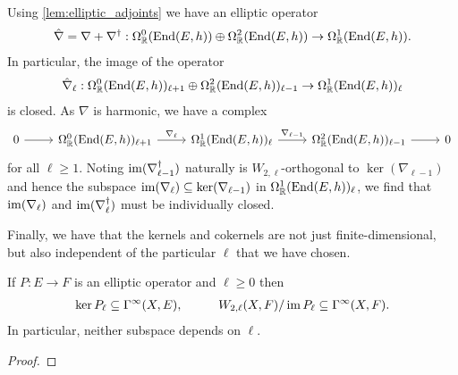 \documentclass[12pt]{ociamthesis}  %
\begin{document}
\begin{example}\label{ex:nabla_hat_elliptic}
  Using \ref{lem:elliptic_adjoints} we have an elliptic operator
  \begin{align*}
    \hat\nabla = \nabla + \nabla^\dagger :
    \Omega^0_{\mathbb R}(\operatorname{End}(E,h)) \oplus
    \Omega^2_{\mathbb R}(\operatorname{End}(E,h)) \to
    \Omega^1_{\mathbb R}(\operatorname{End}(E,h)).
  \end{align*}
  In particular, the image of the operator
  \begin{align*}
    \hat\nabla_\ell :
    \Omega^0_{\mathbb R}(\operatorname{End}(E,h))_{\ell+1}
    \oplus \Omega^2_{\mathbb R}(\operatorname{End}(E,h))_{\ell-1}
    \to \Omega^1_{\mathbb R}(\operatorname{End}(E,h))_\ell
  \end{align*}
  is closed. As $\nabla$ is harmonic, we have a complex 
  \begin{equation*}
    \begin{tikzcd}
      0 & {\Omega^0_{\mathbb R}(\End(E,h))_{\ell+1}} & {\Omega^1_{\mathbb R}(\End(E,h))_\ell} & {\Omega^2_{\mathbb R}(\End(E,h))_{\ell-1}} & 0
      \arrow[from=1-1, to=1-2]
      \arrow["{\nabla_\ell}", from=1-2, to=1-3]
      \arrow["{\nabla_{\ell-1}}", from=1-3, to=1-4]
      \arrow[from=1-4, to=1-5]
    \end{tikzcd}
  \end{equation*}
  for all $\ell\geq 1$.  Noting $\operatorname{im}(\nabla_{\ell-1}^\dagger)$
  naturally is $W_{2,\ell}$-orthogonal to $\ker(\nabla_{\ell-1})$
  and hence the subspace $\operatorname{im}(\nabla_{\ell})\subseteq\ker(\nabla_{\ell-1})$
  in $\Omega^1_{\mathbb R}(\operatorname{End}(E,h))_\ell$, we find that
  $\operatorname{im}(\nabla_\ell)$ and $\operatorname{im}(\nabla_\ell^\dagger)$ must be individually
  closed.
\end{example}

Finally, we have that the kernels and cokernels are not just
finite-dimensional, but also independent of the particular $\ell$
that we have chosen.

\begin{theorem}\label{eq:independence_of_l}
  If $P:E\to F$ is an elliptic operator and $\ell\geq 0$ then
  \begin{align*}
    \ker P_\ell \subseteq \Gamma^\infty(X,E),\hspace{1cm}
    W_{2,\ell}(X,F)/\operatorname{im} P_\ell \subseteq \Gamma^\infty(X,F).
  \end{align*}
  In particular, neither subspace depends on $\ell$.
  \begin{proof}
    \missingproof
  \end{proof}
\end{theorem}
\end{document}
